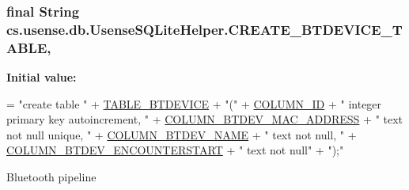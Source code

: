 \subsubsection[{C\+R\+E\+A\+T\+E\+\_\+\+B\+T\+D\+E\+V\+I\+C\+E\+\_\+\+T\+A\+B\+L\+E}]{\setlength{\rightskip}{0pt plus 5cm}final String cs.\+usense.\+db.\+Usense\+S\+Q\+Lite\+Helper.\+C\+R\+E\+A\+T\+E\+\_\+\+B\+T\+D\+E\+V\+I\+C\+E\+\_\+\+T\+A\+B\+L\+E\hspace{0.3cm}{\ttfamily [static]}, {\ttfamily [private]}}\label{classcs_1_1usense_1_1db_1_1_usense_s_q_lite_helper_a1883296a9536bdd979761d56e46fbeec}
{\bfseries Initial value\+:}
\begin{DoxyCode}
= \textcolor{stringliteral}{"create table "}
            + \hyperlink{classcs_1_1usense_1_1db_1_1_usense_s_q_lite_helper_a0badb79aafba332f23c5e5e00a58e5c3}{TABLE\_BTDEVICE} + \textcolor{stringliteral}{"("}
            + \hyperlink{classcs_1_1usense_1_1db_1_1_usense_s_q_lite_helper_ac0c4ad3a273f5adda9bdfc60e679379d}{COLUMN\_ID} + \textcolor{stringliteral}{" integer primary key autoincrement, "}
            + \hyperlink{classcs_1_1usense_1_1db_1_1_usense_s_q_lite_helper_a88746e54f676544fb8a10c6e2fd5843b}{COLUMN\_BTDEV\_MAC\_ADDRESS} + \textcolor{stringliteral}{" text not null unique, "}
            + \hyperlink{classcs_1_1usense_1_1db_1_1_usense_s_q_lite_helper_a85cd491dd37f27b29083f6c04c169246}{COLUMN\_BTDEV\_NAME} + \textcolor{stringliteral}{" text not null, "}
            + \hyperlink{classcs_1_1usense_1_1db_1_1_usense_s_q_lite_helper_aee408d816067ab69e008db348da291b9}{COLUMN\_BTDEV\_ENCOUNTERSTART} + \textcolor{stringliteral}{" text not null"}
            + \textcolor{stringliteral}{");"}
\end{DoxyCode}
Bluetooth pipeline \hypertarget{classcs_1_1usense_1_1db_1_1_usense_s_q_lite_helper_a17a206855921b838c593e04848078d9d}{}
